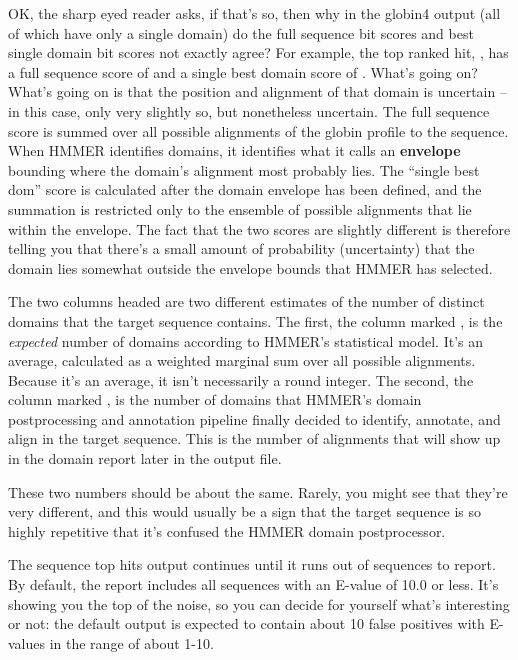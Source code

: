 OK, the sharp eyed reader asks, if that's so, then why in the globin4
output (all of which have only a single domain) do the full sequence
bit scores and best single domain bit scores not exactly agree? For
example, the top ranked hit, \mono{\SGUseqname{}}, 
has a full sequence score of \SGUbitscore{} and a single
best domain score of \SGUdombitscore{}. What's going on? What's going on is that
the position and alignment of that domain is uncertain -- in this
case, only very slightly so, but nonetheless uncertain. The full
sequence score is summed over all possible alignments of the globin
profile to the \mono{\SGUseqname{}} sequence. When HMMER identifies
domains, it identifies what it calls an \textbf{envelope} bounding
where the domain's alignment most probably lies. The ``single best dom'' score is
calculated after the domain envelope has been defined, and the
summation is restricted only to the ensemble of possible alignments
that lie within the envelope. The fact that the two scores are
slightly different is therefore telling you that there's a small
amount of probability (uncertainty) that the domain lies somewhat
outside the envelope bounds that HMMER has selected.

The two columns headed  are two different estimates of
the number of distinct domains that the target sequence contains. The
first, the column marked , is the \emph{expected} number of
domains according to HMMER's statistical model. It's an average,
calculated as a weighted marginal sum over all possible
alignments. Because it's an average, it isn't necessarily a round
integer. The second, the column marked , is the number of
domains that HMMER's domain postprocessing and annotation pipeline
finally decided to identify, annotate, and align in the target
sequence. This is the number of alignments that will show up in the
domain report later in the output file.

These two numbers should be about the same. Rarely, you might see that
they're very different, and this would usually be a sign that the
target sequence is so highly repetitive that it's confused the HMMER
domain postprocessor.

The sequence top hits output continues until it runs out of sequences
to report. By default, the report includes all sequences with an
E-value of 10.0 or less. It's showing you the top of the noise, so you
can decide for yourself what's interesting or not: the default output
is expected to contain about 10 false positives with E-values in the
range of about 1-10.

